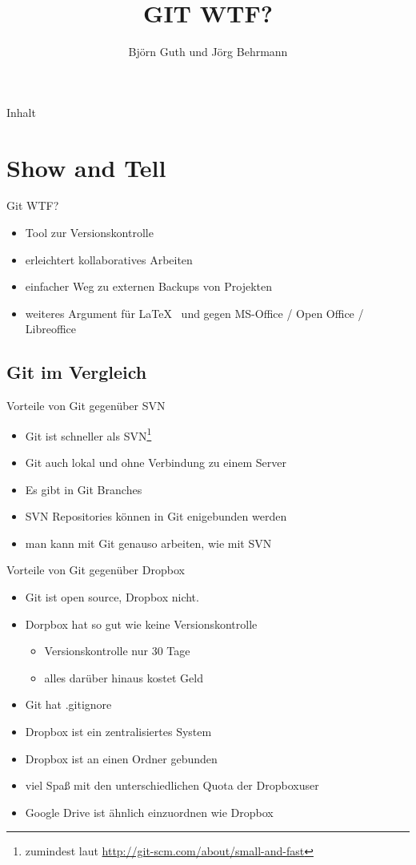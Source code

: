 \documentclass{beamer}
\title{GIT WTF?}
\author{Björn Guth und Jörg Behrmann}
\institute[Fachschaft I/1]{Fachschaft Mathematik/Physik/Informatik der RWTH Aachen}
\begin{document}
\frame[plain]{\titlepage}

\begin{frame}{Inhalt}
	\tableofcontents
\end{frame}

\section{Show and Tell}
\begin{frame}{Git WTF?}
	\begin{itemize}
		\item Tool zur Versionskontrolle
		\item erleichtert kollaboratives Arbeiten
		\item einfacher Weg zu externen Backups von Projekten
		\item weiteres Argument für \LaTeX~ und gegen MS-Office / Open Office / Libreoffice
	\end{itemize}
\end{frame}

\subsection{Git im Vergleich}
\begin{frame}{Vorteile von Git gegenüber SVN}
	\begin{itemize}
		\item Git ist schneller als SVN\footnote{zumindest laut \url{http://git-scm.com/about/small-and-fast}}
		\item Git auch lokal und ohne Verbindung zu einem Server
		\item Es gibt in Git Branches
		\item SVN Repositories können in Git enigebunden werden
		\item man kann mit Git genauso arbeiten, wie mit SVN
	\end{itemize}
\end{frame}

\begin{frame}{Vorteile von Git gegenüber Dropbox}
	\begin{itemize}
		\item Git ist open source, Dropbox nicht.
		\item Dorpbox hat so gut wie keine Versionskontrolle
			\begin{itemize}
				\item Versionskontrolle nur 30 Tage
				\item alles darüber hinaus kostet Geld
			\end{itemize}
		\item Git hat .gitignore
		\item Dropbox ist ein zentralisiertes System
		\item Dropbox ist an einen Ordner gebunden
		\item viel Spaß mit den unterschiedlichen Quota der Dropboxuser
		\item Google Drive ist ähnlich einzuordnen wie Dropbox
	\end{itemize}
\end{frame}
\end{document}
